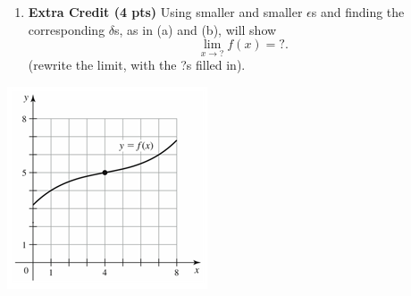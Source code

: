 \documentclass[12pt]{article}
\begin{document}
\begin{enumerate}
\begin{enumerate}
	\item {\bf Extra Credit (4 pts)} Using smaller and smaller $\epsilon$s and finding the corresponding $\delta$s, as in (a) and (b), will show 
	\[\lim_{x\to ?}f(x)=?.\]
	(rewrite the limit, with the ?s filled in).
	\vspace{6pc}
	\end{enumerate}  
\begin{center}\includegraphics[scale=1.5]{exam1sec2p7}\end{center}

\end{enumerate}
\end{document}
